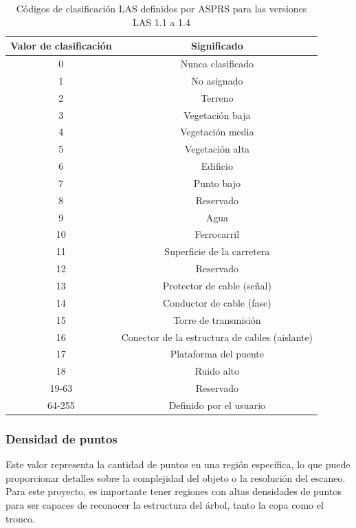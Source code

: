 \begin{table}[hp!]
   \centering
  \begin{tabular}{c|c}
  \rowcolor{udcpink!25}
  \textbf{Valor de clasificación} & \textbf{Significado} \\\hline
  
  0 & Nunca clasificado \\
  1 & No asignado \\
  2 & Terreno  \\
  3 & Vegetación baja  \\
  4 & Vegetación media \\
  5 & Vegetación alta  \\
  6 & Edificio \\
  7 & Punto bajo \\
  8 & Reservado \\
  9 & Agua  \\
  10 & Ferrocarril   \\
  11 & Superficie de la carretera   \\
  12 & Reservado   \\
  13 & Protector de cable (señal)   \\
  14 & Conductor de cable (fase)   \\
  15 & Torre de transmisión   \\
  16 & Conector de la estructura de cables (aislante)   \\
  17 & Plataforma del puente \\
  18 & Ruido alto \\
  19-63 & Reservado \\
  64-255 & Definido por el usuario 

  \end{tabular}

  \caption{Códigos de clasificación LAS definidos por ASPRS para las versiones LAS 1.1 a 1.4}
  \label{tabclas}


\end{table}

\subsubsection{Densidad de puntos}
Este valor representa la cantidad de puntos en una región específica, lo que puede proporcionar detalles sobre la complejidad del objeto o la resolución del escaneo. Para este proyecto, es importante tener regiones con altas densidades de puntos para ser capaces de reconocer la estructura del árbol, tanto la copa como el tronco.

